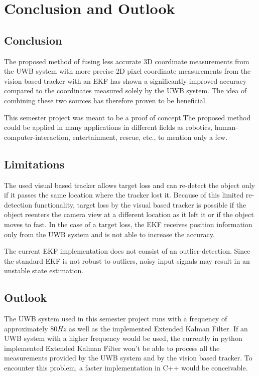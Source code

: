 \chapter{Conclusion and Outlook}

\section{Conclusion}
The proposed method of fusing less accurate 3D coordinate measurements from the \ac{UWB} system with more precise 2D pixel coordinate measurements from the vision based tracker with an \acf{EKF} has shown a significantly improved accuracy compared to the coordinates measured solely by the \ac{UWB} system. The idea of combining these two sources has therefore proven to be beneficial.

This semester project was meant to be a proof of concept.The proposed method could be applied in many applications in different fields as robotics, human-computer-interaction, entertainment, rescue, etc., to mention only a few.

\section{Limitations}
The used visual based tracker allows target loss and can re-detect the object only if it passes the same location where the tracker lost it. Because of this limited re-detection functionality, target loss by the visual based tracker is possible if the object reenters the camera view at a different location as it left it or if the object moves to fast. In the case of a target loss, the \ac{EKF} receives position information only from the \ac{UWB} system and is not able to increase the accuracy.

The current \ac{EKF} implementation does not consist of an outlier-detection. Since the standard \ac{EKF} is not robust to outliers, noisy input signals may result in an unstable state estimation. 


\section{Outlook}\textsl{}
The \ac{UWB} system used in this semester project runs with a frequency of approximately $80\mathit{Hz}$ as well as the implemented Extended Kalman Filter. If an \ac{UWB} system with a higher frequency would be used, the currently in python implemented Extended Kalman Filter won't be able to process all the measurements provided by the \ac{UWB} system and by the vision based tracker. To encounter this problem, a faster implementation in C++ would be conceivable.

